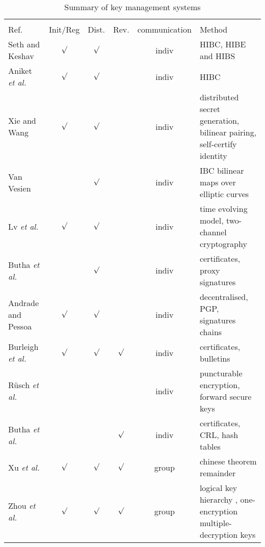 
\begin{table}[h]
\begin{tabular}{p{2cm}ccccp{3cm}}
 & \multicolumn{5}{l}{\cellcolor[HTML]{000000}{\color[HTML]{EFEFEF} Classification of key management systems}} \\
Ref. & \multicolumn{1}{l}{\cellcolor[HTML]{C0C0C0}Init/Reg} & \multicolumn{1}{l}{\cellcolor[HTML]{C0C0C0}Dist.} & \multicolumn{1}{l}{\cellcolor[HTML]{C0C0C0}Rev.} & \multicolumn{1}{l}{\cellcolor[HTML]{C0C0C0}communication} & \multicolumn{1}{l}{\cellcolor[HTML]{C0C0C0}                                   Method} \\
\cellcolor[HTML]{C0C0C0}Seth and Keshav\cite{seth2005practical}  & $\surd$ & $\surd$ &  & indiv & HIBC, HIBE and HIBS \\
\hline
\cellcolor[HTML]{C0C0C0}Aniket \textit{et al.}\cite{kate2007anonymity} & $\surd$ & $\surd$ &  & indiv & HIBC \\
\hline
\cellcolor[HTML]{C0C0C0}Xie and Wang\cite{xie2013practical} & $\surd$ & $\surd$ &  & indiv & distributed secret generation, bilinear pairing, self-certify identity \\
\hline
\cellcolor[HTML]{C0C0C0}Van Vesien \cite{van2010dynamic} & & $\surd$ &  & indiv & IBC bilinear maps over elliptic curves \\
\hline
\cellcolor[HTML]{C0C0C0}Lv \textit{et al.} \cite{lv2014non} & $\surd$ & $\surd$ &  & indiv &  time evolving model, two-channel cryptography \\
\hline
\cellcolor[HTML]{C0C0C0}Butha \textit{et al.} \cite{bhutta2014efficient} &  & $\surd$ &  & indiv & certificates, proxy signatures \\
\hline
\cellcolor[HTML]{C0C0C0}Andrade and Pessoa \cite{de2016fully}  & $\surd$ & $\surd$ &  & indiv & decentralised, PGP, signatures chains \\
\hline
\cellcolor[HTML]{C0C0C0}Burleigh \textit{et al.}\cite{burleigh-dtnwg-dtka-01} & $\surd$ & $\surd$ & $\surd$ & indiv & certificates, bulletins \\
\hline
\cellcolor[HTML]{C0C0C0}R\"{u}sch \textit{et al.}\cite{rusch2017forward} &  &  & & indiv & puncturable encryption, forward secure keys \\
\hline
\cellcolor[HTML]{C0C0C0}Butha \textit{et al.} \cite{bhutta2016public} &  &  & $\surd$ & indiv & certificates, CRL, hash tables \\
\hline
\cellcolor[HTML]{C0C0C0}Xu \textit{et al.} \cite{xu2012chinese} & $\surd$  & $\surd$ & $\surd$ & group & chinese theorem remainder \\
\hline
\cellcolor[HTML]{C0C0C0}Zhou \textit{et al.} \cite{zhou2014autonomic} & $\surd$ & $\surd$ & $\surd$ & group & logical key hierarchy , one-encryption multiple-decryption keys \\
\hline\end{tabular}
\caption{Summary of key management systems}
\label{table:summary}
\end{table}


\FloatBarrier
